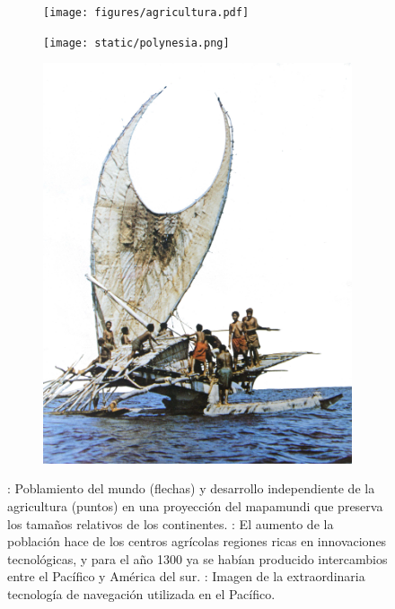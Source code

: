 \documentclass[a4paper,11pt]{book}
\theoremstyle{definition}
\begin{document}
\begin{figure}[ht!]
\centering
 \begin{subfigure}[b]{0.145\textwidth} \centering
  \texttt{[image: figures/agricultura.pdf]}
  \caption{}
  \label{fig:poblamiento}
  \end{subfigure}
 \begin{subfigure}[b]{0.45\textwidth} \centering
  \texttt{[image: static/polynesia.png]}
  \caption{}
  \label{fig:pacifico}
  \end{subfigure}
 \begin{subfigure}[b]{0.24\textwidth} \centering
  \includegraphics[width=\linewidth]{static/tonga_barco.jpg}
  \caption{}
  \label{fig:tecnologia}
  \end{subfigure}
 \caption{
: Poblamiento del mundo (flechas) y desarrollo independiente de la agricultura (puntos) en una proyecci\'on del mapamundi que preserva los tama\~nos relativos de los continentes. : El aumento de la poblaci\'on hace de los centros agr\'icolas regiones ricas en innovaciones tecnol\'ogicas, y para el a\~no 1300 ya se hab\'ian producido intercambios entre el Pac\'ifico y Am\'erica del sur.
: Imagen de la extraordinaria tecnolog\'ia de navegaci\'on utilizada en el Pac\'ifico.
 }
 \label{fig:desert}
 \end{figure}
\end{document}
